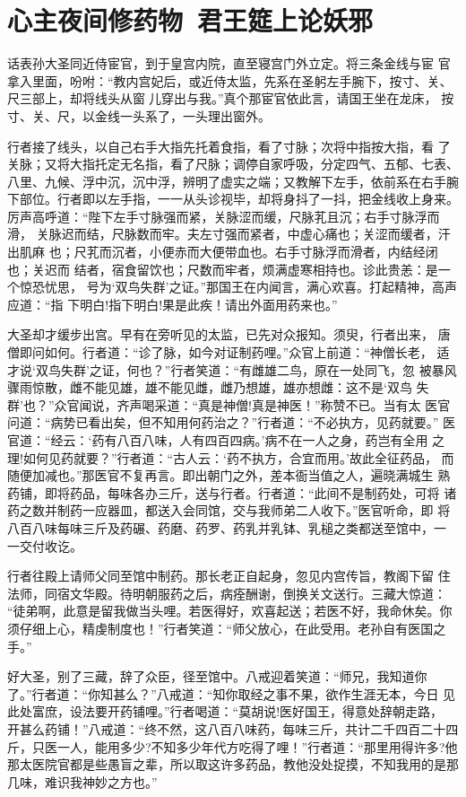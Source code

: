 \chapter{心主夜间修药物~君王筵上论妖邪}

话表孙大圣同近侍宦官，到于皇宫内院，直至寝宫门外立定。将三条金线与宦
官拿入里面，吩咐：“教内宫妃后，或近侍太监，先系在圣躬左手腕下，按寸、关、
尺三部上，却将线头从窗儿穿出与我。”真个那宦官依此言，请国王坐在龙床，
按寸、关、尺，以金线一头系了，一头理出窗外。

行者接了线头，以自己右手大指先托着食指，看了寸脉；次将中指按大指，看
了关脉；又将大指托定无名指，看了尺脉；调停自家呼吸，分定四气、五郁、七表、
八里、九候、浮中沉，沉中浮，辨明了虚实之端；又教解下左手，依前系在右手腕
下部位。行者即以左手指，一一从头诊视毕，却将身抖了一抖，把金线收上身来。
厉声高呼道：“陛下左手寸脉强而紧，关脉涩而缓，尺脉芤且沉；右手寸脉浮而滑，
关脉迟而结，尺脉数而牢。夫左寸强而紧者，中虚心痛也；关涩而缓者，汗出肌麻
也；尺芤而沉者，小便赤而大便带血也。右手寸脉浮而滑者，内结经闭也；关迟而
结者，宿食留饮也；尺数而牢者，烦满虚寒相持也。诊此贵恙：是一个惊恐忧思，
号为‘双鸟失群’之证。”那国王在内闻言，满心欢喜。打起精神，高声应道：“指
下明白!指下明白!果是此疾！请出外面用药来也。”

大圣却才缓步出宫。早有在旁听见的太监，已先对众报知。须臾，行者出来，
唐僧即问如何。行者道：“诊了脉，如今对证制药哩。”众官上前道：“神僧长老，
适才说‘双鸟失群’之证，何也？”行者笑道：“有雌雄二鸟，原在一处同飞，忽
被暴风骤雨惊散，雌不能见雄，雄不能见雌，雌乃想雄，雄亦想雌：这不是‘双鸟
失群’也？”众官闻说，齐声喝采道：“真是神僧!真是神医！”称赞不已。当有太
医官问道：“病势已看出矣，但不知用何药治之？”行者道：“不必执方，见药就要。”
医官道：“经云：‘药有八百八味，人有四百四病。’病不在一人之身，药岂有全用
之理!如何见药就要？”行者道：“古人云：‘药不执方，合宜而用。’故此全征药品，
而随便加减也。”那医官不复再言。即出朝门之外，差本衙当值之人，遍晓满城生
熟药铺，即将药品，每味各办三斤，送与行者。行者道：“此间不是制药处，可将
诸药之数并制药一应器皿，都送入会同馆，交与我师弟二人收下。”医官听命，即
将八百八味每味三斤及药碾、药磨、药罗、药乳并乳钵、乳槌之类都送至馆中，一
一交付收讫。

行者往殿上请师父同至馆中制药。那长老正自起身，忽见内宫传旨，教阁下留
住法师，同宿文华殿。待明朝服药之后，病痊酬谢，倒换关文送行。三藏大惊道：
“徒弟啊，此意是留我做当头哩。若医得好，欢喜起送；若医不好，我命休矣。你
须仔细上心，精虔制度也！”行者笑道：“师父放心，在此受用。老孙自有医国之手。”

好大圣，别了三藏，辞了众臣，径至馆中。八戒迎着笑道：“师兄，我知道你
了。”行者道：“你知甚么？”八戒道：“知你取经之事不果，欲作生涯无本，今日
见此处富庶，设法要开药铺哩。”行者喝道：“莫胡说!医好国王，得意处辞朝走路，
开甚么药铺！”八戒道：“终不然，这八百八味药，每味三斤，共计二千四百二十四
斤，只医一人，能用多少?不知多少年代方吃得了哩！”行者道：“那里用得许多?他
那太医院官都是些愚盲之辈，所以取这许多药品，教他没处捉摸，不知我用的是那
几味，难识我神妙之方也。”

